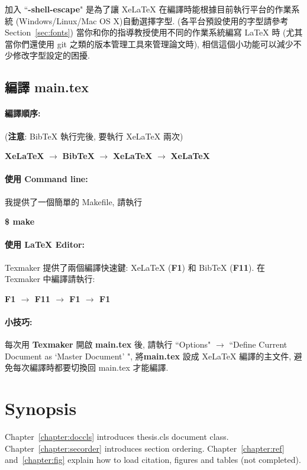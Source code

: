 加入 ``\textbf{-shell-escape}" 是為了讓 XeLaTeX 在編譯時能根據目前執行平台的作業系統 (Windows/Linux/Mac OS X)自動選擇字型.
(各平台預設使用的字型請參考 Section~\ref{sec:fonts})
當你和你的指導教授使用不同的作業系統編寫 LaTeX 時 (尤其當你們還使用 git 之類的版本管理工具來管理論文時), 相信這個小功能可以減少不少修改字型設定的困擾.

\subsection{編譯 main.tex}

\paragraph{編譯順序:} (\textbf{注意}: BibTeX 執行完後, 要執行 XeLaTeX 兩次)

\hspace{2em} \textbf{XeLaTeX} $\rightarrow$ \textbf{BibTeX} $\rightarrow$ \textbf{XeLaTeX} $\rightarrow$ \textbf{XeLaTeX}

\paragraph{使用 Command line:} 我提供了一個簡單的 Makefile, 請執行

\hspace{2em} \textbf{\$ make}

\paragraph{使用 LaTeX Editor:}
Texmaker 提供了兩個編譯快速鍵: XeLaTeX (\textbf{F1}) 和 BibTeX (\textbf{F11}).
在 Texmaker 中編譯請執行:

\hspace{2em} \textbf{F1 $\rightarrow$ F11 $\rightarrow$ F1 $\rightarrow$ F1}

\paragraph{小技巧:} 每次用 \textbf{Texmaker} 開啟 \textbf{main.tex} 後, 請執行 ``Options" $\rightarrow$ ``Define Current Document as `Master Document' ", 將\textbf{main.tex} 設成 XeLaTeX 編譯的主文件, 避免每次編譯時都要切換回 main.tex 才能編譯.

\section{Synopsis}

Chapter~\ref{chapter:doccls} introduces thesis.cls document class.
Chapter~\ref{chapter:secorder} introduces section ordering.
Chapter~\ref{chapter:ref} and~\ref{chapter:fig} explain how to load citation, figures and tables (not completed).